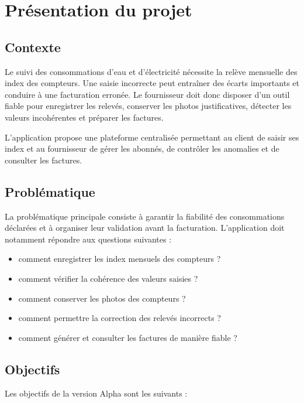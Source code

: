 \section{Présentation du projet}

\subsection{Contexte}

Le suivi des consommations d'eau et d'électricité nécessite la relève mensuelle des index des compteurs. Une saisie incorrecte peut entraîner des écarts importants et conduire à une facturation erronée. Le fournisseur doit donc disposer d'un outil fiable pour enregistrer les relevés, conserver les photos justificatives, détecter les valeurs incohérentes et préparer les factures.

L'application \projectname{} propose une plateforme centralisée permettant au client de saisir ses index et au fournisseur de gérer les abonnés, de contrôler les anomalies et de consulter les factures.

\subsection{Problématique}

La problématique principale consiste à garantir la fiabilité des consommations déclarées et à organiser leur validation avant la facturation. L'application doit notamment répondre aux questions suivantes :

\begin{itemize}[leftmargin=*]
  \item comment enregistrer les index mensuels des compteurs ?
  \item comment vérifier la cohérence des valeurs saisies ?
  \item comment conserver les photos des compteurs ?
  \item comment permettre la correction des relevés incorrects ?
  \item comment générer et consulter les factures de manière fiable ?
\end{itemize}

\subsection{Objectifs}

Les objectifs de la version Alpha sont les suivants :

